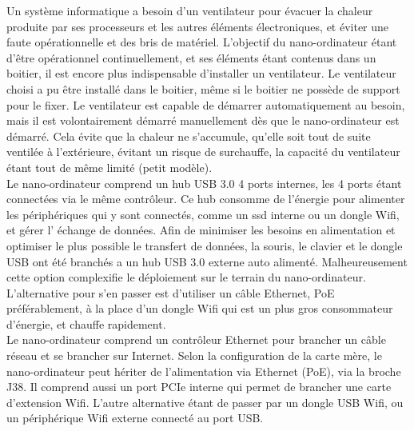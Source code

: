 \noindent Un système informatique a besoin d'un ventilateur pour évacuer la chaleur produite par ses processeurs et les autres éléments électroniques, et éviter une faute opérationnelle et des bris de matériel. L'objectif du nano-ordinateur étant d'être opérationnel continuellement, et ses éléments étant contenus dans un boitier, il est encore plus indispensable d'installer un ventilateur. Le ventilateur choisi a pu être installé dans le boitier, même si le boitier ne possède de support pour le fixer. Le ventilateur est capable de démarrer automatiquement au besoin, mais il est volontairement démarré manuellement dès que le nano-ordinateur est démarré. Cela évite que la chaleur ne s'accumule, qu'elle soit tout de suite ventilée à l'extérieure, évitant un risque de surchauffe, la capacité du ventilateur étant tout de même limité (petit modèle).
\vspace{\baselineskip}
\\
\noindent Le nano-ordinateur comprend un hub USB 3.0 4 ports internes, les 4 ports étant connectées via le même contrôleur. Ce hub consomme de l'énergie pour alimenter les périphériques qui y sont connectés, comme un \acrshort{ssd} interne ou un dongle Wifi, et gérer l’ échange de données. Afin de minimiser les besoins en alimentation et optimiser le plus possible le transfert de données, la souris, le clavier et le dongle USB ont été branchés a un hub USB 3.0 externe auto alimenté. Malheureusement cette option complexifie le déploiement sur le terrain du nano-ordinateur. L'alternative pour s'en passer est d'utiliser un câble Ethernet, PoE préférablement, à la place d'un dongle Wifi qui est un plus gros consommateur d'énergie, et chauffe rapidement.
\vspace{\baselineskip}
\\
\noindent Le nano-ordinateur comprend un contrôleur Ethernet pour brancher un câble réseau et se brancher sur Internet. Selon la configuration de la carte mère, le nano-ordinateur peut hériter de l'alimentation via Ethernet (PoE), via la broche J38. Il comprend aussi un port PCIe interne qui permet de brancher une carte d'extension Wifi. L'autre alternative étant de passer par un dongle USB Wifi, ou un périphérique Wifi externe connecté au port USB. 
